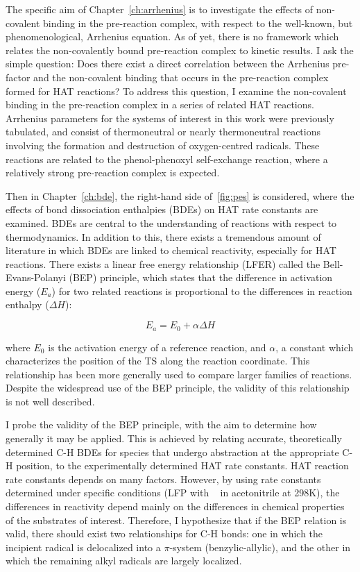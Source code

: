 The specific aim of Chapter~\ref{ch:arrhenius} is to investigate the effects of non-covalent binding in the pre-reaction complex, with respect to the well-known, but phenomenological, Arrhenius equation. As of yet, there is no framework which relates the non-covalently bound pre-reaction complex to kinetic results. I ask the simple question: Does there exist a direct correlation between the Arrhenius pre-factor and the non-covalent binding that occurs in the pre-reaction complex formed for HAT reactions? To address this question, I examine the non-covalent binding in the pre-reaction complex in a series of related HAT reactions. Arrhenius parameters for the systems of interest in this work were previously tabulated,\cite{DiLabio2005} and consist of thermoneutral or nearly thermoneutral reactions involving the formation and destruction of oxygen-centred radicals. These reactions are related to the phenol-phenoxyl self-exchange reaction, where a relatively strong pre-reaction complex is expected.

Then in Chapter~\ref{ch:bde}, the right-hand side of~\ref{fig:pes} is considered, where the effects of bond dissociation enthalpies (BDEs) on HAT rate constants are examined. BDEs are central to the understanding of reactions with respect to thermodynamics. In addition to this, there exists a tremendous amount of literature in which BDEs are linked to chemical reactivity, especially for HAT reactions.\cite{Kochi1973, Tedder1982, Wijtmans2003, Pratt2004, Mayer2004} There exists a linear free energy relationship (LFER) called the Bell-Evans-Polanyi (BEP) principle,\cite{Bell1936,Evans1938} which states that the difference in activation energy ($E_a$) for two related reactions is proportional to the differences in reaction enthalpy ($\Delta H$):

\begin{equation}
  E_a = E_0 + \alpha \Delta H
  \label{eq:bep}
\end{equation}

\noindent where $E_0$ is the activation energy of a reference reaction, and $\alpha$, a constant which characterizes the position of the TS along the reaction coordinate. This relationship has been more generally used to compare larger families of reactions. Despite the widespread use of the BEP principle, the validity of this relationship is not well described.

I probe the validity of the BEP principle, with the aim to determine how generally it may be applied. This is achieved by relating accurate, theoretically determined C-H BDEs for species that undergo abstraction at the appropriate C-H position, to the experimentally determined HAT rate constants. HAT reaction rate constants depends on many factors. However, by using rate constants determined under specific conditions (LFP with \cumo~ in acetonitrile at 298K), the differences in reactivity depend mainly on the differences in chemical properties of the substrates of interest. Therefore, I hypothesize that if the BEP relation is valid, there should exist two relationships for C-H bonds: one in which the incipient radical is delocalized into a $\pi$-system (benzylic-allylic), and the other in which the remaining alkyl radicals are largely localized.

